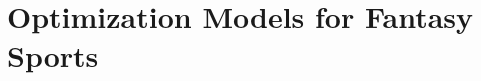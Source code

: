 \section{Optimization Models for Fantasy Sports} \label{Opt_Models_for_Fantasy_Sports}

\begin{comment}


- skrive generelt om hvordan optimering er i fantasy verdenen. Er det noe som er mye brukt, hvilke type fantasy er det mye brukt? har det vært en stor suksess? 

\end{comment}

\begin{comment}
- skrive generelt om hvordan optimering er i sport verdenen, og at det mest fremtredende er feltet sport scheduling

- fortelle at det ikke finnes stort av optimering i fantasy sports, og der det finnes litt er i NFL. 

- fortelle kjapt om artiklene gibson og fry om hva de gjør og hva som er bra og hva som ikke passer godt med FPL. se på Giovanni sin artikkel om dette og kopiere. 

- Snakke om artikkelen Matthews et al(2012) hvor de utvikler en "agent" hvor de modellerer problemet som en Markov Decision Problem i Premier League. Forklare at de aldri bruker en optimeringsmodell men deres approach og resutlater gir motivasjon til at å bruke benytte operation research på FPL. Forklare også at det er kun gamechippen wildcard som er modellert og ikke de andre. 

- fortelle om artikkelen "optimization modelling for analyzing fantasy sport games(2012)" diskuterer common characteristics of fantasy sports games og og presenterer en MIP som kan brukes for å analysere ex-post resultater(ergo ingen usikkerhet i modellen) for fantasy sports games. Modellen deres blir testet på en sykkel fantasy og gir ønskede resultater. Deres modell inneholder modellering inneholder de viktigste aspektene ved Fantasy sports inkudert modellering av transfers og substitutions, men de har ikke med modellering av features som captain og wildcards. 

- Artikkel om argentisk liga(2013). Fortelle om at de er de første som har brukt en optimeringsmodell på en Fotball Fantasy Sports og er en motivasjon for oppgaven. Fortelle hva som er bra med det de gjør, som er ting som er viktig å tenke på når vi utvikler noe. Fortelle også hva som er annerledes med deres problem og vårt, og fortelle hva som er mindre bra med det de gjør i forhold til oss. 

- fortelle om artikkel "optimized tiered daily fantasy sports(2017)" og hvordan de bruker varians i modellen deres og det er noe man burde tenke på i utformingen av modellen. 

\end{comment}

